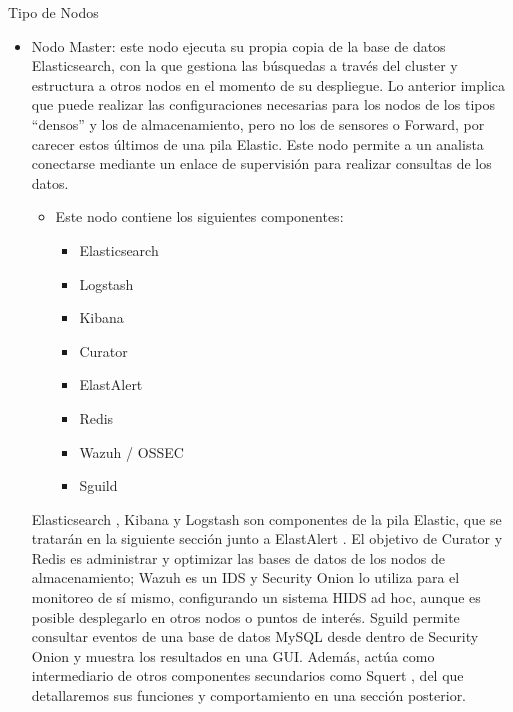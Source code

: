     \begin{subsubsection}{Tipo de Nodos}
        \begin{itemize}
          \item Nodo Master: este nodo ejecuta su propia copia de la base de datos Elasticsearch, con la que gestiona las búsquedas a través del cluster y estructura a otros nodos en el momento de su despliegue. Lo anterior implica que puede realizar las configuraciones necesarias para los nodos de los tipos “densos” y los de almacenamiento, pero no los de sensores o Forward, por carecer estos últimos de una pila Elastic. Este nodo permite a un analista conectarse mediante un enlace de supervisión para realizar consultas de los datos.
          \begin{itemize}
              \item  Este nodo contiene los siguientes componentes:
              \begin{itemize}
                  \item Elasticsearch \cite{elastic}
                  \item Logstash \cite{elastic}
                  \item Kibana \cite{elastic}
                  \item Curator \cite{curator}
                  \item ElastAlert \cite{elasalert}
                  \item Redis \cite{redis}
                  \item Wazuh \cite{wazuh} / OSSEC \cite{ossec}
                  \item Sguild \cite{sguil}
              \end{itemize}
          \end{itemize}
          Elasticsearch \cite{elastic}, Kibana \cite{elastic} y Logstash \cite{elastic} son componentes de la pila Elastic, que se tratarán en la siguiente sección junto a ElastAlert \cite{elasalert}. El objetivo de Curator \cite{curator} y Redis \cite{redis} es administrar y optimizar las bases de datos de los nodos de almacenamiento; Wazuh \cite{wazuh} es un IDS y Security Onion lo utiliza para el monitoreo de sí mismo, configurando un sistema HIDS ad hoc, aunque es posible desplegarlo en otros nodos o puntos de interés. Sguild \cite{sguil} permite consultar eventos de una base de datos MySQL desde dentro de Security Onion y muestra los resultados en una GUI. Además, actúa como intermediario de otros componentes secundarios como Squert \cite{squert}, del que detallaremos sus funciones y comportamiento en una sección posterior. 

\end{itemize}
\end{subsubsection}
